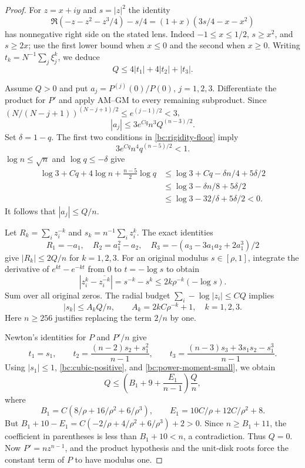 \begin{proof}
For $z=x+iy$ and $s=|z|^2$ the identity
\[
 \Re(-z-z^2-z^3/4)-s/4
 =(1+x)(3s/4-x-x^2)
\]
has nonnegative right side on the stated lens.  Indeed
$-1\leq x\leq1/2$, $s\geq x^2$, and $s\geq2x$; use the first
lower bound when $x\leq0$ and the second when $x\geq0$.
Writing $t_k=N^{-1}\sum_j\xi_j^k$, we deduce
\begin{equation}\label{bc:cubic-positive}
 Q\leq4|t_1|+4|t_2|+|t_3|.
\end{equation}

Assume $Q>0$ and put $a_j=P^{(j)}(0)/P(0)$, $j=1,2,3$.
Differentiate the product for $P'$ and apply AM--GM to every remaining
subproduct.  Since $(N/(N-j+1))^{(N-j+1)/2}\leq e^{(j-1)/2}<3$,
\[
 |a_j|\leq3e^{Cq}n^3Q^{(n-3)/2}.
\]
Set $\delta=1-q$.  The first two conditions in
\eqref{bc:rigidity-floor} imply
\[
 3e^{Cq}n^4q^{(n-5)/2}<1.
\]
$\log n\leq\sqrt n$ and $\log q\leq-\delta$ give
\begin{align*}
 \log3+Cq+4\log n+\tfrac{n-5}2\log q
 &\leq\log3+Cq-\delta n/4+5\delta/2\\
 &\leq\log3-\delta n/8+5\delta/2\\
 &\leq\log3-32/\delta+5\delta/2<0.
\end{align*}
It follows that $|a_j|\leq Q/n$.

Let $R_k=\sum_i z_i^{-k}$ and $s_k=n^{-1}\sum_i z_i^k$.  The exact
identities
\[
 R_1=-a_1,\quad R_2=a_1^2-a_2,\quad
 R_3=-(a_3-3a_1a_2+2a_1^3)/2
\]
give $|R_k|\leq2Q/n$ for $k=1,2,3$.  For an original modulus
$s\in[\rho,1]$, integrate the derivative of $e^{kt}-e^{-kt}$ from
$0$ to $t=-\log s$ to obtain
\[
 |z_i^k-\overline{z_i^{-k}}|
 =s^{-k}-s^k\leq2k\rho^{-k}(-\log s).
\]
Sum over all original zeros.  The radial budget
$\sum_i-\log|z_i|\leq CQ$ implies
\begin{equation}\label{bc:power-moment-small}
 |s_k|\leq A_kQ/n,\qquad A_k=2kC\rho^{-k}+1,\quad k=1,2,3.
\end{equation}
Here $n\geq256$ justifies replacing the term $2/n$ by one.

Newton's identities for $P$ and $P'/n$ give
\[
 t_1=s_1,\qquad
 t_2=\frac{(n-2)s_2+s_1^2}{n-1},\qquad
 t_3=\frac{(n-3)s_3+3s_1s_2-s_1^3}{n-1}.
\]
Using $|s_1|\leq1$, \eqref{bc:cubic-positive}, and
\eqref{bc:power-moment-small}, we obtain
\[
 Q\leq\left(B_1+9+\frac{E_1}{n-1}\right)\frac Qn,
\]
where
\[
 B_1=C(8/\rho+16/\rho^2+6/\rho^3),\qquad
 E_1=10C/\rho+12C/\rho^2+8.
\]
But $B_1+10-E_1=C(-2/\rho+4/\rho^2+6/\rho^3)+2>0$.
Since $n\geq B_1+11$, the coefficient in parentheses is less than
$B_1+10<n$, a contradiction.  Thus $Q=0$.
Now $P'=nz^{n-1}$, and the product hypothesis and the unit-disk roots
force the constant term of $P$ to have modulus one.
\end{proof}

